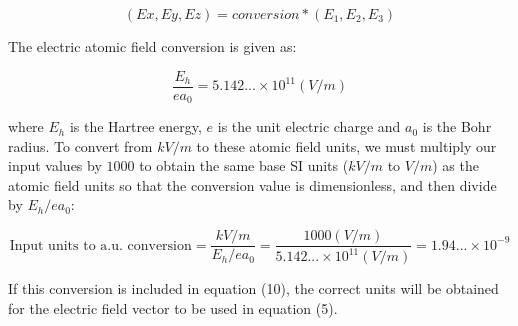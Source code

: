 \documentclass[10pt]{article}
\begin{document}
\begin{equation}
	(Ex, Ey, Ez) = conversion*(E_1, E_2, E_3)
\end{equation}

The electric atomic field conversion is given as:

$$\frac{E_h}{ea_0} = 5.142...\times 10^{11} (V/m)$$

where $E_h$ is the Hartree energy, $e$ is the unit electric charge and $a_0$ is the Bohr radius. To convert from $kV/m$ to these atomic field units, we must multiply our input values by $1000$ to obtain the same base SI units ($kV/m$ to $V/m$) as the atomic field units so that the conversion value is dimensionless, and then divide by $E_h/ea_0$:

$$\text{Input units to a.u. conversion} = \frac{kV/m}{E_h/ea_0} = \frac{1000(V/m)}{5.142...\times 10^{11} (V/m)} = 1.94...\times10^{-9}$$




If this conversion is included in equation (10), the correct units will be obtained for the electric field vector to be used in equation (5).
\\



\end{document}
